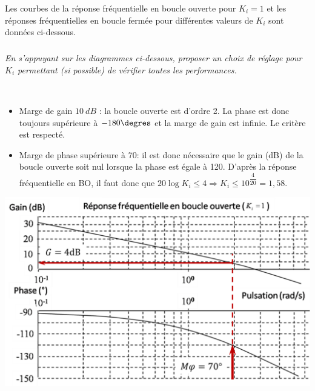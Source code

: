 \documentclass[10pt,fleqn]{article} %
\begin{document}
\begin{multicols}{2}
\ifprof
\else
Les courbes de la réponse fréquentielle en boucle ouverte pour
$K_i=1$ et les réponses fréquentielles en boucle fermée pour différentes valeurs de $K_i$ sont données ci-dessous.
\fi

\subparagraph{}
\textit{En s'appuyant sur les diagrammes ci-dessous, proposer un choix de réglage pour $K_i$ permettant (si possible) de vérifier toutes les performances.}
\ifprof
\begin{corrige}~\\
\begin{itemize}
\item Marge de gain $\SI{10}{dB}$ :  la boucle ouverte est d'ordre 2. La phase est donc toujours supérieure à $-180\degres$ et la marge de gain est infinie. Le critère est respecté. 
\item Marge de phase supérieure à 70\degres : il est donc nécessaire que le gain (dB) de la boucle ouverte soit nul lorsque la phase est égale à 120\degres. D'après la réponse fréquentielle en BO, il faut donc que $20\log K_i \leq 4 \Rightarrow K_i \leq  10^{\dfrac{4}{20}}=1,58$.
\end{itemize}

\begin{center}
\includegraphics[width=\linewidth]{images/bo_cor}
\end{center}


\end{corrige}
\end{multicols}
\end{document}
